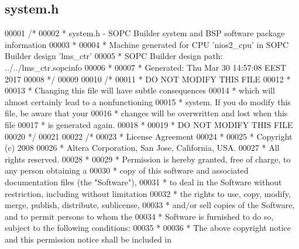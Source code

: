 \subsection{system.\+h}
\label{system_8h_source}

\begin{DoxyCode}
00001 \textcolor{comment}{/*}
00002 \textcolor{comment}{ * system.h - SOPC Builder system and BSP software package information}
00003 \textcolor{comment}{ *}
00004 \textcolor{comment}{ * Machine generated for CPU 'nios2\_cpu' in SOPC Builder design 'lms\_ctr'}
00005 \textcolor{comment}{ * SOPC Builder design path: ../../lms\_ctr.sopcinfo}
00006 \textcolor{comment}{ *}
00007 \textcolor{comment}{ * Generated: Thu Mar 30 14:57:08 EEST 2017}
00008 \textcolor{comment}{ */}
00009 
00010 \textcolor{comment}{/*}
00011 \textcolor{comment}{ * DO NOT MODIFY THIS FILE}
00012 \textcolor{comment}{ *}
00013 \textcolor{comment}{ * Changing this file will have subtle consequences}
00014 \textcolor{comment}{ * which will almost certainly lead to a nonfunctioning}
00015 \textcolor{comment}{ * system. If you do modify this file, be aware that your}
00016 \textcolor{comment}{ * changes will be overwritten and lost when this file}
00017 \textcolor{comment}{ * is generated again.}
00018 \textcolor{comment}{ *}
00019 \textcolor{comment}{ * DO NOT MODIFY THIS FILE}
00020 \textcolor{comment}{ */}
00021 
00022 \textcolor{comment}{/*}
00023 \textcolor{comment}{ * License Agreement}
00024 \textcolor{comment}{ *}
00025 \textcolor{comment}{ * Copyright (c) 2008}
00026 \textcolor{comment}{ * Altera Corporation, San Jose, California, USA.}
00027 \textcolor{comment}{ * All rights reserved.}
00028 \textcolor{comment}{ *}
00029 \textcolor{comment}{ * Permission is hereby granted, free of charge, to any person obtaining a}
00030 \textcolor{comment}{ * copy of this software and associated documentation files (the "Software"),}
00031 \textcolor{comment}{ * to deal in the Software without restriction, including without limitation}
00032 \textcolor{comment}{ * the rights to use, copy, modify, merge, publish, distribute, sublicense,}
00033 \textcolor{comment}{ * and/or sell copies of the Software, and to permit persons to whom the}
00034 \textcolor{comment}{ * Software is furnished to do so, subject to the following conditions:}
00035 \textcolor{comment}{ *}
00036 \textcolor{comment}{ * The above copyright notice and this permission notice shall be included in}

\end{DoxyCode}
